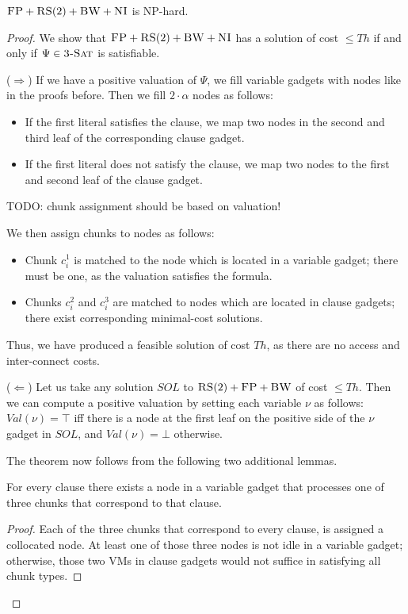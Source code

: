 \documentclass[9pt,twocolumn]{scrartcl}
\newcommand{\variab}{\nu}
\newcommand{\clauses}{\alpha}
\newcommand{\achunk}{\ensuremath{c}}
\newcommand{\CC}{\textsc{NI}}
\newcommand{\FP}{\textsc{FP}}
\newcommand{\RS}{\textsc{RS}}
\newcommand{\BW}{\textsc{BW}}
\newcommand{\TSAT}{\textsc{3-Sat}}
\newcommand{\Formula}{\ensuremath{\Psi}}
\newcommand{\Thr}{\ensuremath{Th}}
\newcommand{\Val}{\ensuremath{Val}}
\newcommand{\Sol}{\ensuremath{SOL}}
\begin{document}
\begin{appendix}
\begin{theorem}
$\FP+\RS(2)+\BW+\CC$ is NP-hard.
\end{theorem}
\begin{proof}
We show that $\FP+\RS(2)+\BW+\CC$ has a solution of cost $\leq
  \Thr$ if and only if $\Formula\in \TSAT$ is satisfiable.

($\Rightarrow$) If we have a positive valuation of $\Formula$, we fill variable gadgets with nodes like in
the proofs before. Then we fill $2 \cdot \clauses$ nodes as follows:
\begin{itemize}
\item If the first literal satisfies the clause, we map two nodes in the second and
third leaf of the corresponding clause gadget.
\item If the first literal does not satisfy the clause, we map two nodes to the first
and second leaf of the clause gadget.
\end{itemize}

TODO: chunk assignment should be based on valuation!

We then assign chunks to nodes as follows:
\begin{itemize}
\item Chunk $\achunk_i^1$ is matched to the node which is located in a variable gadget; there
must be one, as the valuation satisfies the formula.
\item Chunks $\achunk_i^2$ and $\achunk_i^3$ are matched to nodes which are
located in clause
gadgets; there exist corresponding minimal-cost solutions.
\end{itemize}

Thus, we have produced a feasible solution of cost $\Thr$, as there are no
access and inter-connect costs.

($\Leftarrow$)
Let us take any solution $\Sol$ to $\RS(2)+\FP+\BW$ of cost $\leq \Thr$.
Then we can compute a positive valuation by setting each variable $\variab$
as follows:
$\Val(\variab)= \top$ iff there is a node at the first leaf on the positive side of the $\variab$ gadget in $\Sol$,
and $\Val(\variab)=\bot$ otherwise.


The theorem now follows from the following two additional lemmas.
\begin{lemma}
For every clause there exists a node in a variable gadget that processes one of
  three chunks that correspond to that clause.
\end{lemma}
\begin{proof}
 Each of the three chunks that correspond to every clause,
 is assigned a collocated node.
 At least one of those three nodes is not idle in a variable gadget;
otherwise, those two VMs in clause gadgets would not suffice in
satisfying all chunk types.
\end{proof}


\end{proof}
\end{appendix}
\end{document}
